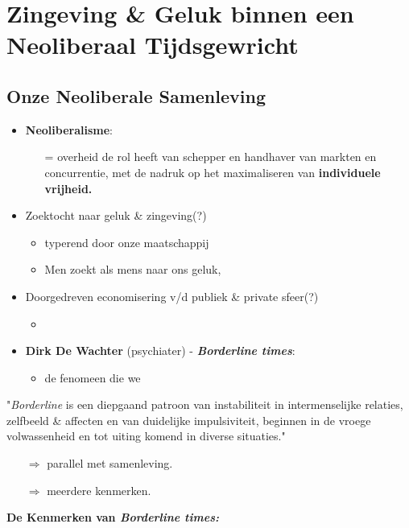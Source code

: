 \section{Zingeving \& Geluk binnen een Neoliberaal Tijdsgewricht}

\subsection*{Onze Neoliberale Samenleving}
\begin{itemize}
	\item \textbf{Neoliberalisme}:
	\begin{itemize}
		\item[=] overheid de rol heeft van schepper en handhaver van markten en concurrentie, met de nadruk op het maximaliseren van \textbf{individuele vrijheid.}
	\end{itemize}
	\item Zoektocht naar geluk \& zingeving(?)
	\begin{itemize}
		\item typerend door onze maatschappij
		\item Men zoekt als mens naar ons geluk, 
	\end{itemize}
	\item Doorgedreven economisering v/d publiek \& private sfeer(?)
	\begin{itemize}
		\item 
	\end{itemize}
	\item \textbf{Dirk De Wachter} (psychiater) - \textbf{\textit{Borderline times}}:
	\begin{itemize}
		\item de fenomeen die we
	\end{itemize}
\end{itemize}
\begin{center}
	"\textit{Borderline} is een diepgaand patroon van instabiliteit in intermenselijke relaties, zelfbeeld \& affecten en van duidelijke impulsiviteit, beginnen in de vroege volwassenheid en tot uiting komend in diverse situaties."
\end{center}
\begin{itemize}
	\item[$\Rightarrow$] parallel met samenleving.
	\item[$\Rightarrow$] meerdere kenmerken.
\end{itemize}
\textbf{De Kenmerken van \textit{Borderline times:}}
